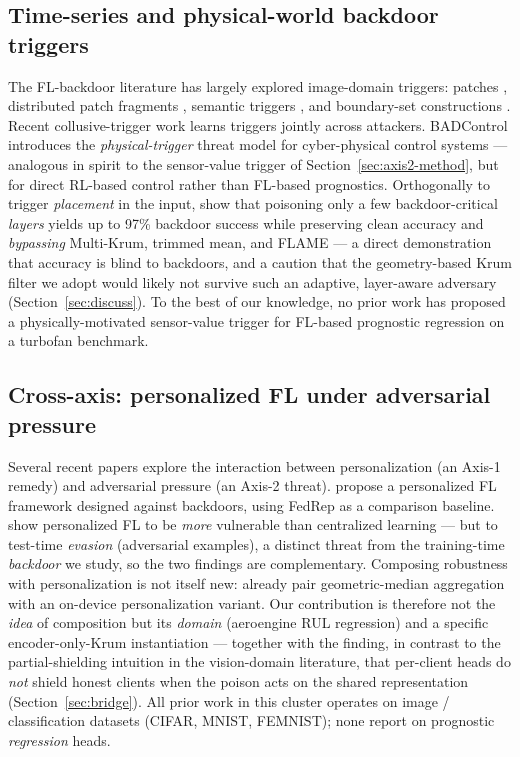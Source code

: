 \documentclass[a4paper,fleqn,doubleblind]{cas-sc}
\begin{document}
\subsection{Time-series and physical-world backdoor triggers}
\label{subsec:related-triggers}

The FL-backdoor literature has largely explored image-domain
triggers: patches \citep{Bagdasaryan2020BackdoorFL}, distributed
patch fragments \citep{Xie2020DBA}, semantic triggers
\citep{Bhagoji2019AdversarialLens}, and boundary-set
constructions \citep{Yang2023BoundaryTrigger}. Recent
collusive-trigger work \citep{Lyu2025CoBA} learns triggers
jointly across attackers. BADControl
\citep{Burbano2026BADControl} introduces the
\emph{physical-trigger} threat model for cyber-physical control
systems --- analogous in spirit to the sensor-value trigger of
Section~\ref{sec:axis2-method}, but for direct RL-based control
rather than FL-based prognostics. Orthogonally to trigger
\emph{placement} in the input, \citet{Foroughi2026LSA} show that
poisoning only a few backdoor-critical \emph{layers} yields up to
97\% backdoor success while preserving clean accuracy and
\emph{bypassing} Multi-Krum, trimmed mean, and FLAME --- a direct
demonstration that accuracy is blind to backdoors, and a caution that
the geometry-based Krum filter we adopt would likely not survive such
an adaptive, layer-aware adversary (Section~\ref{sec:discuss}).
To the best of our knowledge,
no prior work has proposed a physically-motivated sensor-value
trigger for FL-based prognostic regression on a turbofan
benchmark.

\subsection{Cross-axis: personalized FL under adversarial pressure}
\label{subsec:related-crossaxis}

Several recent papers explore the interaction between
personalization (an Axis-1 remedy) and adversarial pressure (an
Axis-2 threat). \citet{Zhang2024SARS} propose a personalized FL
framework designed against backdoors, using FedRep as a
comparison baseline. \citet{Fan2026RobustPFL} show personalized FL
to be \emph{more} vulnerable than centralized learning --- but to
test-time \emph{evasion} (adversarial examples), a distinct threat
from the training-time \emph{backdoor} we study, so the two findings
are complementary. Composing robustness with personalization is not
itself new: \citet{Pillutla2022RFA} already pair geometric-median
aggregation with an on-device personalization variant. Our
contribution is therefore not the \emph{idea} of composition but its
\emph{domain} (aeroengine RUL regression) and a specific
encoder-only-Krum instantiation --- together with the finding, in
contrast to the partial-shielding intuition in the vision-domain
literature, that per-client heads do \emph{not} shield honest clients
when the poison acts on the shared representation
(Section~\ref{sec:bridge}). All prior work in this cluster operates
on image / classification datasets (CIFAR, MNIST, FEMNIST); none
report on prognostic \emph{regression} heads.
\end{document}
